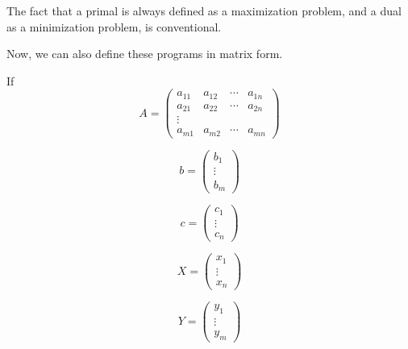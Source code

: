     The fact that a primal is always defined as a maximization problem, and a dual as a minimization problem, is conventional.

    Now, we can also define these programs in matrix form.

    If
    \begin{equation}
        A = 
        \begin{pmatrix}
            a_{11} & a_{12} & \cdots & a_{1n}\\
            a_{21} & a_{22} & \cdots & a_{2n}\\
            \vdots\\
            a_{m1} & a_{m2} & \cdots & a_{mn}
        \end{pmatrix}
    \end{equation}

    \begin{equation}
        b = 
        \begin{pmatrix}
            b_1\\
            \vdots\\
            b_m
        \end{pmatrix}
    \end{equation}
    
    \begin{equation}
        c = 
        \begin{pmatrix}
            c_1\\
            \vdots\\
            c_n
        \end{pmatrix}
    \end{equation}

    \begin{equation}
        X = 
        \begin{pmatrix}
            x_1\\
            \vdots\\
            x_n
        \end{pmatrix}
    \end{equation}

    \begin{equation}
        Y = 
        \begin{pmatrix}
            y_1\\
            \vdots\\
            y_m
        \end{pmatrix}
    \end{equation}

